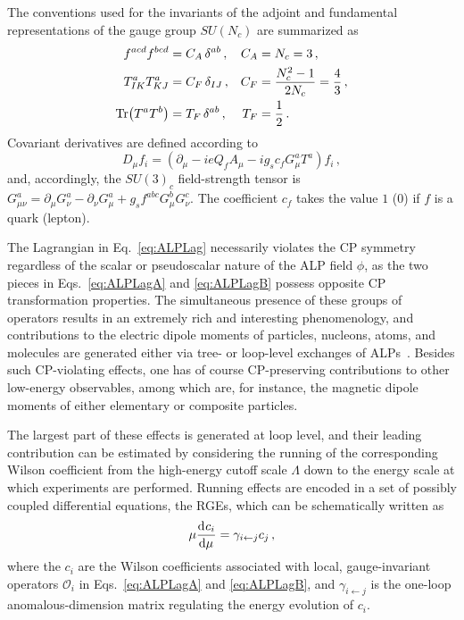 The conventions used for the invariants of the adjoint and fundamental representations of the
gauge group $SU(N_c)$ are summarized as
\begin{align}
    f^{acd}f^{bcd} &= C_A\,\delta^{ab}\,, &
    C_A &= N_c = 3\,, \\
    T^a_{IK}T^a_{KJ} &= C_F\, \delta_{IJ}\,, & C_F &=\frac{N_c^2-1}{2N_c}=\frac{4}{3}\,, \\
    \Tr(T^a T^b) &= T_F\, \delta^{ab}\,, &
    T_F &= \frac{1}{2}\,.
\end{align}
Covariant derivatives are defined according to
\begin{equation}
\label{eq:ALPCovDev}
D_\mu f_i  = \left( \partial_\mu - i e Q_f A_\mu - i g_s c_f  G_\mu^a  T^a \right) f_i\,,
\end{equation}
and, accordingly, the $SU(3)_c$ field-strength tensor is
$G^a_{\mu\nu} = \partial_\mu G_\nu^a - \partial_\nu G_\mu^a + g_s f^{abc} G_\mu^b G_\nu^c$.
The coefficient $c_f$ takes the value $1$ ($0$) if $f$ is a quark (lepton).

The Lagrangian in Eq.~\eqref{eq:ALPLag} necessarily violates the CP symmetry regardless of the
scalar or pseudoscalar nature of the ALP field $\phi$, as the two pieces in
Eqs.~\eqref{eq:ALPLagA} and \eqref{eq:ALPLagB} possess opposite CP transformation properties.
The simultaneous presence of these groups of operators results in an extremely rich and
interesting phenomenology, and contributions to the electric dipole moments of particles,
nucleons, atoms, and molecules are generated either via tree- or loop-level exchanges of
ALPs~\cite{Marciano:2016yhf,DiLuzio:2020oah}.
Besides such CP-violating effects, one has of course CP-preserving contributions to other
low-energy observables, among which are, for instance, the magnetic dipole moments of either
elementary or composite particles.

The largest part of these effects is generated at loop level, and their leading contribution
can be estimated by considering the running of the corresponding Wilson coefficient from the
high-energy cutoff scale $\Lambda$ down to the energy scale at which experiments are performed.
Running effects are encoded in a set of possibly coupled differential equations, the
RGEs, which can be schematically written as
\begin{equation}
\label{eq:ALPAnomalousDimension}
    \mu  \dv[]{c_i}{\mu} = \gamma_{i \leftarrow j} c_{j}\,,
\end{equation}
where the $c_i$ are the Wilson coefficients associated with local, gauge-invariant operators
$\mathcal{O}_i$ in Eqs.~\eqref{eq:ALPLagA} and \eqref{eq:ALPLagB}, and $\gamma_{i \leftarrow j}$ is the one-loop anomalous-dimension matrix regulating
the energy evolution of $c_i$.

